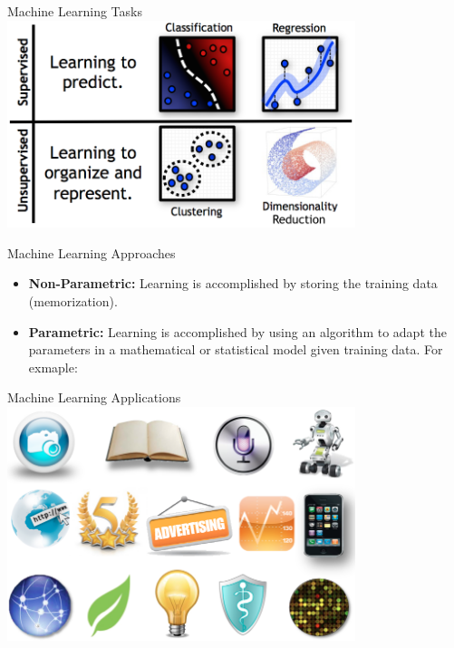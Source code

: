 \documentclass[serif,xcolor=pdftex,dvipsnames,table,hyperref={bookmarks=false,breaklinks}]{beamer}
\begin{document}
\begin{frame}[t]{Machine Learning Tasks}
 \centering
 \includegraphics[width=4in]{../Figures/learning_problems.png}
\end{frame}

\begin{frame}[t]{Machine Learning Approaches}
  \begin{itemize}[<+->]
    \item \textbf{Non-Parametric:} Learning is accomplished by storing the training data (memorization).
    
    \item \textbf{Parametric:} Learning is accomplished by using an algorithm to adapt the parameters in a mathematical or statistical model given training data. For exmaple:\\
    
    
  \end{itemize}
\end{frame}

\begin{frame}[t]{Machine Learning Applications}
 \centering
 \includegraphics[width=4in]{../Figures/ml_applications.png}
\end{frame}
\end{document}
